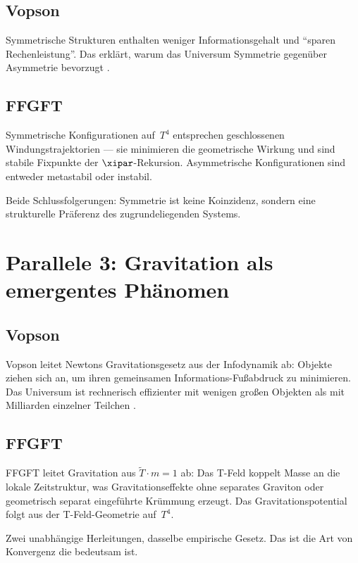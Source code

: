 \subsection{Vopson}

Symmetrische Strukturen enthalten weniger Informationsgehalt und ``sparen
Rechenleistung''. Das erklärt, warum das Universum Symmetrie gegenüber
Asymmetrie bevorzugt \cite{Vopson2024}.

\subsection{FFGFT}

Symmetrische Konfigurationen auf~$T^4$ entsprechen geschlossenen
Windungstrajektorien --- sie minimieren die geometrische Wirkung und sind
stabile Fixpunkte der $\xipar$-Rekursion. Asymmetrische Konfigurationen
sind entweder metastabil oder instabil.

Beide Schlussfolgerungen: Symmetrie ist keine Koinzidenz, sondern eine
strukturelle Präferenz des zugrundeliegenden Systems.

\section{Parallele 3: Gravitation als emergentes Phänomen}

\subsection{Vopson}

Vopson leitet Newtons Gravitationsgesetz aus der Infodynamik ab: Objekte
ziehen sich an, um ihren gemeinsamen Informations-Fußabdruck zu minimieren.
Das Universum ist rechnerisch effizienter mit wenigen großen Objekten
als mit Milliarden einzelner Teilchen \cite{Vopson2022}.

\subsection{FFGFT}

FFGFT leitet Gravitation aus $\tilde{T} \cdot m = 1$ ab: Das T-Feld koppelt
Masse an die lokale Zeitstruktur, was Gravitationseffekte ohne separates
Graviton oder geometrisch separat eingeführte Krümmung erzeugt. Das
Gravitationspotential folgt aus der T-Feld-Geometrie auf~$T^4$.

Zwei unabhängige Herleitungen, dasselbe empirische Gesetz. Das ist die Art
von Konvergenz die bedeutsam ist.

